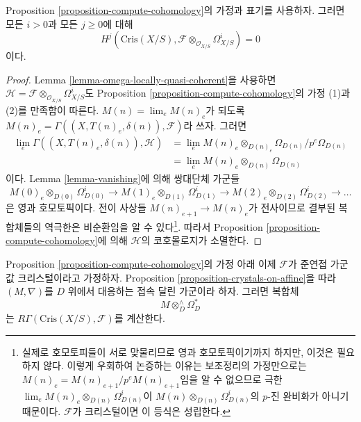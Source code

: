 \begin{lemma}
\label{lemma-cohomology-is-zero}
Proposition \ref{proposition-compute-cohomology}의 가정과 표기를
사용하자. 그러면 모든 $i > 0$과 모든 $j \geq 0$에 대해
$$
H^j(\text{Cris}(X/S), \mathcal{F} \otimes_{\mathcal{O}_{X/S}} \Omega^i_{X/S})
= 0
$$
이다.
\end{lemma}

\begin{proof}
Lemma \ref{lemma-omega-locally-quasi-coherent}을 사용하면
$\mathcal{H} = \mathcal{F} \otimes_{\mathcal{O}_{X/S}} \Omega^i_{X/S}$도
Proposition \ref{proposition-compute-cohomology}의 가정 (1)과 (2)를
만족함이 따른다. $M(n) = \lim_e M(n)_e$가 되도록
$M(n)_e = \Gamma((X, T(n)_e, \delta(n)), \mathcal{F})$라 쓰자. 그러면
\begin{align*}
\lim_e \Gamma((X, T(n)_e, \delta(n)), \mathcal{H}) & =
\lim_e M(n)_e \otimes_{D(n)_e} \Omega_{D(n)}/p^e\Omega_{D(n)} \\
& = \lim_e M(n)_e \otimes_{D(n)} \Omega_{D(n)}
\end{align*}
이다. Lemma \ref{lemma-vanishing}에 의해 쌍대단체 가군들
$$
M(0)_e \otimes_{D(0)} \Omega^i_{D(0)} \to
M(1)_e \otimes_{D(1)} \Omega^i_{D(1)} \to
M(2)_e \otimes_{D(2)} \Omega^i_{D(2)} \to \ldots
$$
은 영과 호모토픽이다. 전이 사상들
$M(n)_{e + 1} \to M(n)_e$가 전사이므로 결부된 복합체들의
역극한은 비순환임을 알 수 있다\footnote{실제로 호모토피들이 서로
맞물리므로 영과 호모토픽이기까지 하지만, 이것은 필요하지 않다.
이렇게 우회하여 논증하는 이유는 보조정리의 가정만으로는
$M(n)_e = M(n)_{e + 1}/p^eM(n)_{e + 1}$임을 알 수 없으므로
극한 $\lim_e M(n)_e \otimes_{D(n)} \Omega^i_{D(n)}$이
$M(n) \otimes_{D(n)} \Omega^i_{D(n)}$의 $p$-진 완비화가 아니기
때문이다. $\mathcal{F}$가 크리스털이면 이 등식은 성립한다.}.
따라서 Proposition \ref{proposition-compute-cohomology}에 의해
$\mathcal{H}$의 코호몰로지가 소멸한다.
\end{proof}

\begin{proposition}
\label{proposition-compute-cohomology-crystal}
Proposition \ref{proposition-compute-cohomology}의 가정 아래 이제
$\mathcal{F}$가 준연접 가군 값 크리스털이라고 가정하자.
Proposition \ref{proposition-crystals-on-affine}을 따라 $(M, \nabla)$를
$D$ 위에서 대응하는 접속 달린 가군이라 하자. 그러면 복합체
$$
M \otimes^\wedge_D \Omega^*_D
$$
는 $R\Gamma(\text{Cris}(X/S), \mathcal{F})$를 계산한다.
\end{proposition}


